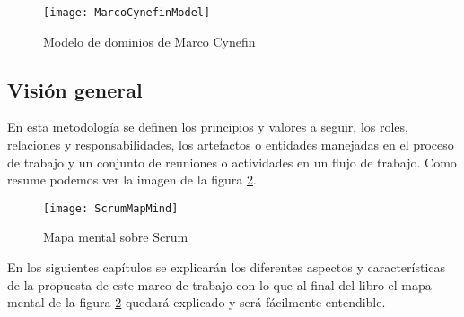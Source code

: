 \begin{figure}[h]
  \centering
  \texttt{[image: MarcoCynefinModel]}
  \caption{Modelo de dominios de Marco Cynefin}
  \centering
  \label{fig:MarcoCynefinModel} %
\end{figure}

\subsection{Visión general}

En esta metodología se definen los principios y valores a seguir, los roles, relaciones y responsabilidades, los artefactos o entidades manejadas en el proceso de trabajo y un conjunto de reuniones o actividades en un flujo de trabajo. Como resume podemos ver la imagen de la figura \ref{fig:ScrumMapMind}.

\begin{figure}[h]
  \centering
  \texttt{[image: ScrumMapMind]}
  \caption{Mapa mental sobre Scrum}
  \centering
  \label{fig:ScrumMapMind} %
\end{figure}

En los siguientes capítulos se explicarán los diferentes aspectos y características de la propuesta de este marco de trabajo con lo que 
al final del libro el mapa mental de la figura \ref{fig:ScrumMapMind} quedará explicado y será fácilmente entendible. 

